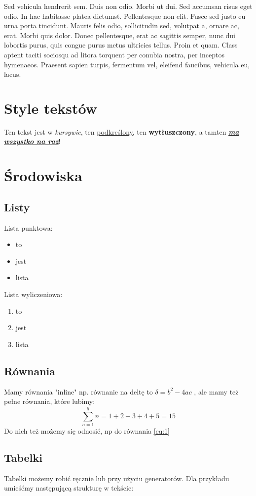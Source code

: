 \documentclass{article}
\begin{document}
Sed
vehicula hendrerit sem. Duis non odio. Morbi ut dui. Sed accumsan risus eget
odio. In hac habitasse platea dictumst. Pellentesque non elit. Fusce sed justo
eu urna porta tincidunt. Mauris felis odio, sollicitudin sed, volutpat a, ornare
ac, erat. Morbi quis dolor. Donec pellentesque, erat ac sagittis semper, nunc
dui lobortis purus, quis congue purus metus ultricies tellus. Proin et quam.
Class aptent taciti sociosqu ad litora torquent per conubia nostra, per inceptos
hymenaeos. Praesent sapien turpis, fermentum vel, eleifend faucibus, vehicula
eu, lacus.

\section{Style tekstów}
Ten tekst jest w \textit{kursywie}, ten \underline{podkreślony}, ten \textbf{wytłuszczony}, a tamten \underline{\textbf{\textit{ma wszystko na raz}}}!

\section{Środowiska}
\subsection{Listy}
Lista punktowa:
\begin{itemize}
    \item to
    \item jest
    \item lista
\end{itemize}
Lista wyliczeniowa:
\begin{enumerate}
    \item to
    \item jest
    \item lista
\end{enumerate}
\subsection{Równania}

Mamy równania "inline" np. równanie na deltę to 
$ \delta = b^2 - 4ac$
, ale mamy też pełne równania, które lubimy:
\begin{equation} \label{eq:1}
 \sum^{5}_{n=1} n = 1 + 2 + 3 + 4 + 5 = 15    
\end{equation}
Do nich też możemy się odnosić, np do równania \ref{eq:1}
\subsection{Tabelki}
Tabelki możemy robić ręcznie lub przy użyciu generatorów. Dla przykładu
umieśćmy następującą strukturę w tekście:
\end{document}
